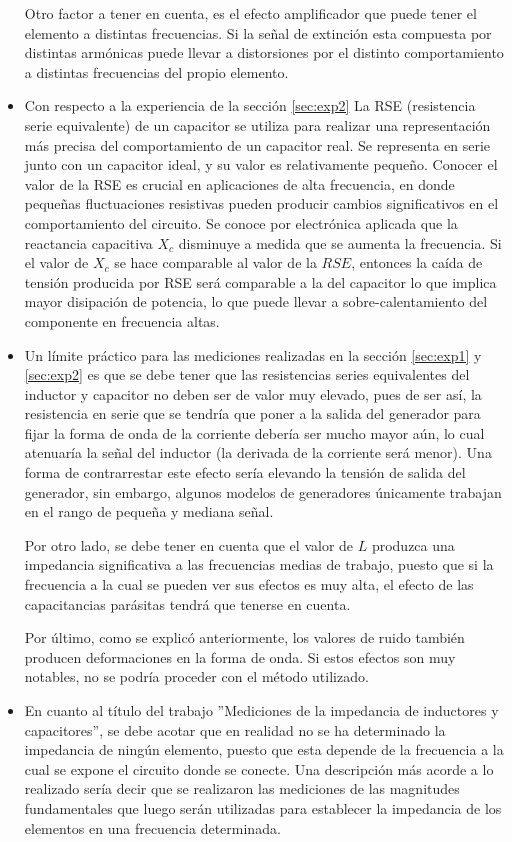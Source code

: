\begin{itemize}
Otro factor a tener en cuenta, es el efecto amplificador que puede tener el elemento a distintas frecuencias. Si la señal de extinción esta compuesta por distintas armónicas puede llevar a distorsiones por el distinto comportamiento a distintas frecuencias del propio elemento.



\item Con respecto a la experiencia de la sección \ref{sec:exp2} La RSE (resistencia serie equivalente) de un capacitor se utiliza para realizar una representación más precisa del comportamiento de un capacitor real. Se representa en serie junto con un capacitor ideal, y su valor es relativamente pequeño. Conocer el valor de la RSE es crucial en aplicaciones de alta frecuencia, en donde pequeñas fluctuaciones resistivas pueden producir cambios significativos en el comportamiento del circuito. Se conoce por electrónica aplicada que la reactancia capacitiva $X_c$ disminuye a medida que se aumenta la frecuencia. Si el valor de $X_c$ se hace comparable al valor de la $RSE$, entonces la caída de tensión producida por RSE será comparable a la del capacitor lo que implica mayor disipación de potencia, lo que puede llevar a sobre-calentamiento del componente en frecuencia altas.

\item Un límite práctico para las mediciones realizadas en la sección \ref{sec:exp1} y \ref{sec:exp2} es que se debe tener que las resistencias series equivalentes del inductor y capacitor no deben ser de valor muy elevado, pues de ser así, la resistencia en serie que se tendría que poner a la salida del generador para fijar la forma de onda de la corriente debería ser mucho mayor aún, lo cual atenuaría la señal del inductor (la derivada de la corriente será menor). Una forma de contrarrestar este efecto sería elevando la tensión de salida del generador, sin embargo, algunos modelos de generadores únicamente trabajan en  el rango de pequeña y mediana señal.

Por otro lado, se debe tener en cuenta que el valor de $L$ produzca una impedancia significativa a las frecuencias medias de trabajo, puesto que si la frecuencia a la cual se pueden ver sus efectos es muy alta, el efecto de las capacitancias parásitas tendrá que tenerse en cuenta.

Por último, como se explicó anteriormente, los valores de ruido también producen deformaciones en la forma de onda. Si estos efectos son muy notables, no se podría proceder con el método utilizado.

\item En cuanto al título del trabajo ''Mediciones de la impedancia de inductores y
capacitores'', se debe acotar que en realidad no se ha determinado la impedancia de ningún elemento, puesto que esta depende de la frecuencia a la cual se expone el circuito donde se conecte. Una descripción más acorde a lo realizado sería decir que se realizaron las mediciones de las magnitudes fundamentales que luego serán utilizadas para establecer la impedancia de los elementos en una frecuencia determinada.

\end{itemize}